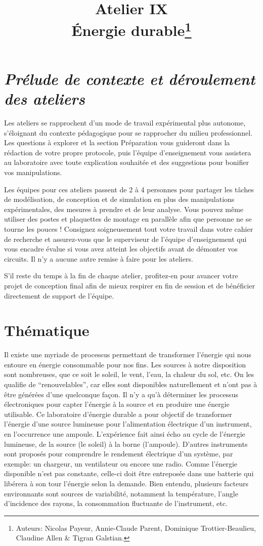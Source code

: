 \documentclass[canadien,12pt,oneside,letterpaper]{article}
\title{\textbf{Atelier IX}\\Énergie durable\thanks{Auteurs: Nicolas Payeur, Annie-Claude Parent, Dominique Trottier-Beaulieu, Claudine Allen \& Tigran Galstian.}}
\date{}
\begin{document}
\maketitle \vspace{-17ex}
\section{\textit{\textbf{Prélude de contexte et déroulement des ateliers}}}
\vspace{-2ex}
Les ateliers se rapprochent d’un mode de travail expérimental plus autonome,
s’éloignant du contexte pédagogique pour se rapprocher du milieu professionnel. Les questions à explorer et la section Préparation vous guideront dans la rédaction de votre propre protocole, puis l’équipe d’enseignement vous assistera au laboratoire avec toute explication souhaitée et des suggestions pour bonifier vos manipulations. 

Les équipes pour ces ateliers passent de 2 à 4 personnes pour partager les tâches de modélisation, de conception et de simulation en plus des manipulations expérimentales, des mesures à prendre et de leur analyse. Vous pouvez même utiliser des postes et plaquettes de montage en parallèle afin que personne ne se tourne les pouces ! Consignez soigneusement tout votre travail dans votre cahier
de recherche et assurez-vous que le superviseur de l’équipe d’enseignement qui vous
encadre évalue si vous avez atteint les objectifs avant de démonter vos circuits. Il
n’y a aucune autre remise à faire pour les ateliers.

S’il reste du temps à la fin de chaque atelier, profitez-en pour
avancer votre projet de conception final afin de mieux respirer en fin de session et
de bénéficier directement de support de l’équipe.
\newpage
\section{Thématique}\label{sec:thematique}
\vspace{-2ex}
Il existe une myriade de processus permettant de transformer l’énergie qui nous entoure en énergie consommable pour nos fins. Les sources à notre disposition sont nombreuses, que ce soit le soleil, le vent, l’eau, la chaleur du sol, etc. On les qualifie de “renouvelables”, car elles sont disponibles naturellement et n’ont pas à être générées d’une quelconque façon. Il n’y a qu’à déterminer les processus électroniques pour capter l'énergie à la source et en produire une énergie utilisable. Ce laboratoire d'énergie durable a pour objectif de transformer l'énergie d'une source lumineuse pour l'alimentation électrique d'un instrument, en l'occurrence une ampoule. L'expérience fait ainsi écho au cycle de l'énergie lumineuse, de la source (le soleil) à la borne (l'ampoule). D'autres instruments sont proposés pour comprendre le rendement électrique d'un système, par exemple: un chargeur, un ventilateur ou encore une radio. Comme l'énergie disponible n'est pas constante, celle-ci doit être entreposée dans une batterie qui libérera à son tour l'énergie selon la demande. Bien entendu, plusieurs facteurs environnants sont sources de variabilité, notamment la température, l'angle d'incidence des rayons, la consommation fluctuante de l'instrument, etc.
\end{document}
